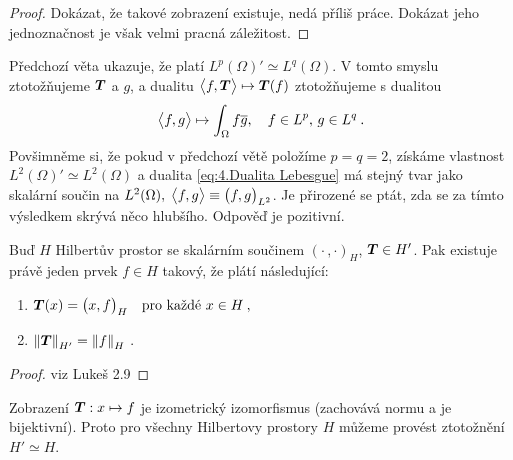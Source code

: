 \begin{proof}
Dokázat, že takové zobrazení existuje, nedá příliš práce. Dokázat jeho jednoznačnost je však velmi pracná záležitost.
\end{proof}

Předchozí věta ukazuje, že platí $L^p(\Omega)' \simeq L^q(\Omega)$. V tomto smyslu ztotožňujeme $\boldsymbol{T}$ a $g$, a dualitu $\big< f, \boldsymbol{T} \big> \mapsto \boldsymbol{T}(f)$ ztotožňujeme s dualitou
\begin{equation}
    \big< f, g \big> \mapsto \int_\Omega f \overline{g}, \quad f \in L^p, \, g \in L^q \: .
    \label{eq:4.Dualita Lebesgue}
\end{equation}
Povšimněme si, že pokud v předchozí větě položíme $p=q=2$, získáme vlastnost $L^2(\Omega)' \simeq L^2(\Omega)$ a dualita \eqref{eq:4.Dualita Lebesgue} má stejný tvar jako skalární součin na $L^2(\Omega), \; \big< f, g \big> \equiv \big( f, g \big)_{L^2}$. Je přirozené se ptát, zda se za tímto výsledkem skrývá něco hlubšího. Odpověď je pozitivní.

\begin{theorem} \label{4.Riesz-Frechet}
Buď $H$ Hilbertův prostor se skalárním součinem $(\cdot \, , \cdot)_H$, $\boldsymbol{T} \in H'$.
Pak existuje právě jeden prvek $f \in H $ takový, že plátí následující:
\begin{enumerate}
    \item $\boldsymbol{T}(x) = \big( x, f \big)_H \quad \text{pro každé } x \in H \:, $
    \item $\left\lVert\boldsymbol{T}\right\rVert_{H'} = \left\lVert f\right\rVert_H \:.$
\end{enumerate}
\end{theorem}
\begin{proof}
viz Lukeš 2.9
\end{proof}

\begin{corollary}
Zobrazení $\boldsymbol{T}: x \mapsto f$ je izometrický izomorfismus (zachovává normu a je bijektivní). Proto pro všechny Hilbertovy prostory $H$ můžeme provést ztotožnění $H' \simeq H$. %
\end{corollary}


